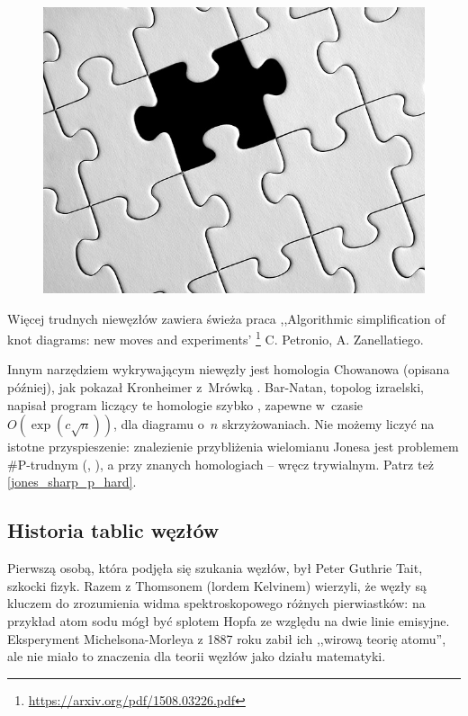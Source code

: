 {\begin{figure}[H]
    \begin{minipage}[b]{.32\linewidth}
        \centering
        \includegraphics[width=\linewidth]{../data/missing.jpg}
    \end{minipage}
\end{figure}

Więcej trudnych niewęzłów zawiera świeża praca
,,Algorithmic simplification of knot diagrams: new moves and experiments'
\footnote{\url{https://arxiv.org/pdf/1508.03226.pdf}}
C. Petronio, A. Zanellatiego.

Innym narzędziem wykrywającym niewęzły jest homologia Chowanowa (opisana później),
jak pokazał Kronheimer z~Mrówką \cite{kronheimer11}.
Bar-Natan, topolog izraelski, napisał program liczący te homologie szybko \cite{barnatan07},
zapewne w~czasie $O(\exp(c \sqrt n))$, dla diagramu o~$n$ skrzyżowaniach.
Nie możemy liczyć na istotne przyspieszenie:
znalezienie przybliżenia wielomianu Jonesa jest problemem \#P-trudnym (\cite{kuperberg15}, \cite{vertigan05}),
a przy znanych homologiach -- wręcz trywialnym.
Patrz też \ref{jones_sharp_p_hard}.

\subsection{Historia tablic węzłów}
Pierwszą osobą, która podjęła się szukania węzłów, był Peter Guthrie Tait, szkocki fizyk.
Razem z Thomsonem (lordem Kelvinem) wierzyli, że węzły są kluczem do zrozumienia widma spektroskopowego różnych pierwiastków: na przykład atom sodu mógł być splotem Hopfa ze względu na dwie linie emisyjne.
Eksperyment Michelsona-Morleya z 1887 roku zabił ich ,,wirową teorię atomu'', ale nie miało to znaczenia dla teorii węzłów jako działu matematyki.

}
